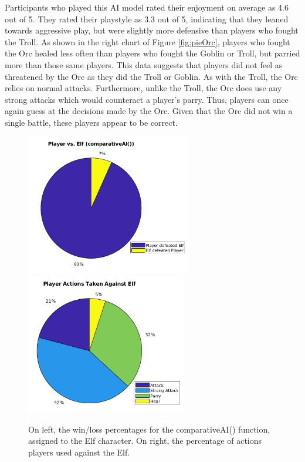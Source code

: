 Participants who played this AI model rated their enjoyment on average as 4.6 out of 5. They rated their playstyle as 3.3 out of 5, indicating that they leaned towards aggressive play, but were slightly more defensive than players who fought the Troll. As shown in the right chart of Figure \ref{fig:pieOrc}, players who fought the Orc healed less often than players who fought the Goblin or Troll, but parried more than those same players. This data suggests that players did not feel as threatened by the Orc as they did the Troll or Goblin. As with the Troll, the Orc relies on normal attacks. Furthermore, unlike the Troll, the Orc does use any strong attacks which would counteract a player's parry. Thus, players can once again guess at the decisions made by the Orc. Given that the Orc did not win a single battle, these players appear to be correct.\\

\begin{figure}[H]
  \centering
  \includegraphics[width=7.25cm]{figures/elfWins.png}
  \includegraphics[width=7cm]{figures/actionsElf.png}
  \caption{On left, the win/loss percentages for the comparativeAI() function, assigned to the Elf character. On right, the percentage of actions players used against the Elf.}
  \label{fig:pieElf}
\end{figure}

